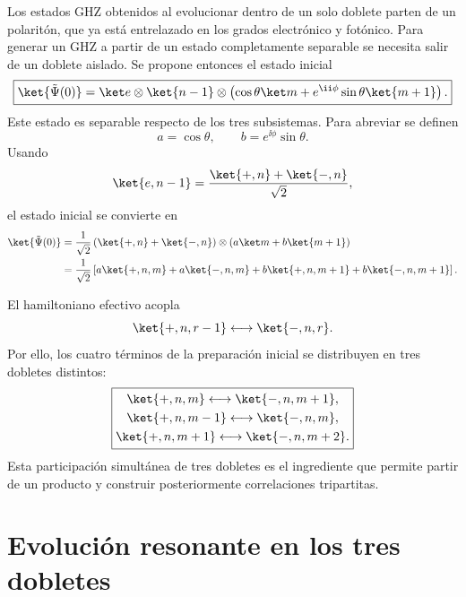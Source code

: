 Los estados GHZ obtenidos al evolucionar dentro de un solo doblete parten de
un polarit\'on, que ya est\'a entrelazado en los grados electr\'onico y
fot\'onico. Para generar un GHZ a partir de un estado completamente separable
se necesita salir de un doblete aislado. Se propone entonces el estado inicial
\begin{equation}
  \boxed{
  \ket{\tilde\Psi(0)}
  =
  \ket e\otimes\ket{n-1}
  \otimes
  \left(
  \cos\theta\ket m
  +e^{\ii\phi}\sin\theta\ket{m+1}
  \right).
  }
\end{equation}
Este estado es separable respecto de los tres subsistemas. Para abreviar se
definen
\begin{equation}
  a=\cos\theta,
  \qquad
  b=e^{\ii\phi}\sin\theta.
\end{equation}
Usando
\begin{equation}
  \ket{e,n-1}
  =
  \frac{\ket{+,n}+\ket{-,n}}{\sqrt2},
\end{equation}
el estado inicial se convierte en
\begin{equation}
\begin{aligned}
  \ket{\tilde\Psi(0)}
  &=\frac{1}{\sqrt2}
  \left(\ket{+,n}+\ket{-,n}\right)
  \otimes
  \left(a\ket m+b\ket{m+1}\right)
  \\
  &=
  \frac{1}{\sqrt2}
  \left[
  a\ket{+,n,m}
  +a\ket{-,n,m}
  +b\ket{+,n,m+1}
  +b\ket{-,n,m+1}
  \right].
\end{aligned}
\end{equation}

El hamiltoniano efectivo acopla
\begin{equation}
  \ket{+,n,r-1}
  \longleftrightarrow
  \ket{-,n,r}.
\end{equation}
Por ello, los cuatro t\'erminos de la preparaci\'on inicial se distribuyen en
tres dobletes distintos:
\begin{equation}
  \boxed{
  \begin{gathered}
  \ket{+,n,m}\longleftrightarrow\ket{-,n,m+1},
  \\
  \ket{+,n,m-1}\longleftrightarrow\ket{-,n,m},
  \\
  \ket{+,n,m+1}\longleftrightarrow\ket{-,n,m+2}.
  \end{gathered}
  }
\end{equation}
Esta participaci\'on simult\'anea de tres dobletes es el ingrediente que permite
partir de un producto y construir posteriormente correlaciones tripartitas.

\section{Evoluci\'on resonante en los tres dobletes}

